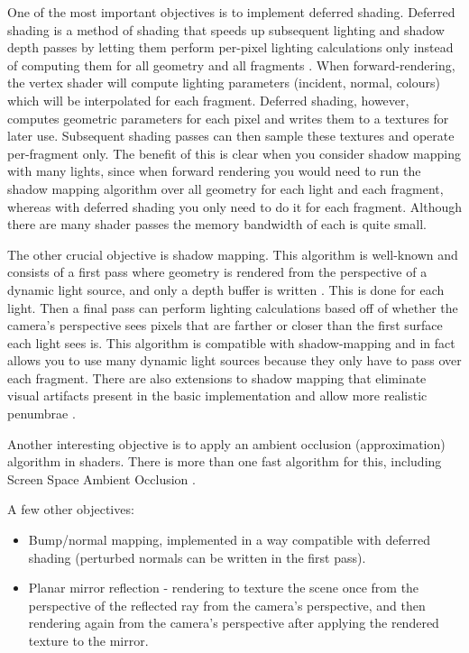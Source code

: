 \documentclass {article}
\begin{document}
\begin{description}
    One of the most important objectives is to implement deferred shading. Deferred shading is a method of shading that speeds up subsequent lighting and shadow depth passes by letting them perform per-pixel lighting calculations only instead of computing them for all geometry and all fragments \cite{ferkoreal}.
    When forward-rendering, the vertex shader will compute lighting parameters (incident, normal, colours) which will be interpolated for each fragment. Deferred shading, however, computes geometric parameters for each pixel and writes them to a textures for later use. Subsequent shading passes can then sample these textures and operate per-fragment only. The benefit of this is clear when you consider shadow mapping with many lights, since when forward rendering you would need to run the shadow mapping algorithm over all geometry for each light and each fragment, whereas with deferred shading you only need to do it for each fragment. Although there are many shader passes the memory bandwidth of each is quite small.

    The other crucial objective is shadow mapping. This algorithm is well-known and consists of a first pass where geometry is rendered from the perspective of a dynamic light source, and only a depth buffer is written \cite{williams1978casting}. This is done for each light. Then a final pass can perform lighting calculations based off of whether the camera's perspective sees pixels that are farther or closer than the first surface each light sees is. This algorithm is compatible with shadow-mapping and in fact allows you to use many dynamic light sources because they only have to pass over each fragment. There are also extensions to shadow mapping that eliminate visual artifacts present in the basic implementation and allow more realistic penumbrae \cite{dimitrov2007cascaded} \cite{fernando2005percentage}.

    Another interesting objective is to apply an ambient occlusion (approximation) algorithm in shaders. There is more than one fast algorithm for this, including Screen Space Ambient Occlusion \cite{kajalinshaderx7}\cite{mittring2007finding}.

    A few other objectives:
    \begin{itemize}
      \item
        Bump/normal mapping, implemented in a way compatible with deferred shading (perturbed normals can be written in the first pass).

      \item
        Planar mirror reflection - rendering to texture the scene once from the perspective of the reflected ray from the camera's perspective, and then rendering again from the camera's perspective after applying the rendered texture to the mirror.


\end{itemize}
\end{description}
\end{document}
